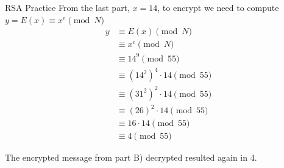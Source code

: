 \begin{homeworkProblem}{RSA Practice}
    From the last part, $x=14$, to encrypt we need to compute $y=E(x) \equiv x^e \pmod{N}$\
    \[
        \begin{split}
            y & \equiv E(x) \pmod{N} \\
            &\equiv x^e \pmod{N} \\
            &\equiv 14^9 \pmod{55} \\
            &\equiv (14^2)^4 \cdot 14 \pmod{55} \\
            &\equiv (31^2)^2 \cdot 14 \pmod{55} \\
            &\equiv (26)^2 \cdot 14 \pmod{55} \\
            &\equiv 16 \cdot 14 \pmod{55} \\
            &\equiv 4 \pmod{55}
        \end{split}
    \]
    
    The encrypted message from part B) decrypted resulted again in 4.

\end{homeworkProblem}
